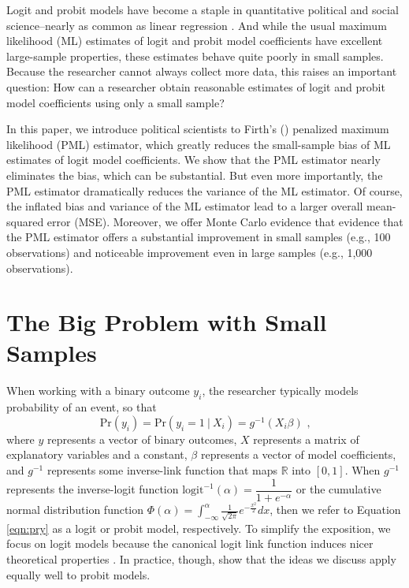 \documentclass[12pt]{article}
\begin{document}
 \vspace{5mm}
 \begin{center}
 \end{center}

\thispagestyle{empty}

\newpage
\doublespace


Logit and probit models have become a staple in quantitative political and social science--nearly as common as linear regression \citep{KruegerLewisBeck2008}. 
And while the usual maximum likelihood (ML) estimates of logit and probit model coefficients have excellent large-sample properties, these estimates behave quite poorly in small samples. 
Because the researcher cannot always collect more data, this raises an important question: How can a researcher obtain reasonable estimates of logit and probit model coefficients using only a small sample?

In this paper, we introduce political scientists to Firth's (\citeyear{Firth1993}) penalized maximum likelihood (PML) estimator, which greatly reduces the small-sample bias of ML estimates of logit model coefficients. 
We show that the PML estimator nearly eliminates the bias, which can be substantial. 
But even more importantly, the PML estimator dramatically reduces the variance of the ML estimator. 
Of course, the inflated bias and variance of the ML estimator lead to a larger overall mean-squared error (MSE). 
Moreover, we offer Monte Carlo evidence that evidence that the PML estimator offers a substantial improvement in small samples (e.g., 100 observations) and noticeable improvement even in large samples (e.g., 1,000 observations).

\section*{The Big Problem with Small Samples}

When working with a binary outcome $y_i$, the researcher typically models probability of an event, so that
\begin{equation}\label{eqn:pry}
\text{Pr}(y_i) = \text{Pr}(y_i = 1~|~ X_i) =  g^{-1}(X_i\beta)\text{ ,}
\end{equation}
where $y$ represents a vector of binary outcomes, $X$ represents a matrix of explanatory variables and a constant, $\beta$ represents a vector of model coefficients, and $g^{-1}$ represents some inverse-link function that maps $\mathbb{R}$ into $[0, 1]$. 
When $g^{-1}$ represents the inverse-logit function $\text{logit}^{-1}(\alpha) = \dfrac{1}{1 + e^{-\alpha}}$ or the cumulative normal distribution function $\Phi(\alpha) = \int_{-\infty}^\alpha \frac{1}{\sqrt{2\pi}}e^{-\frac{x^2}{2}}dx$, then we refer to Equation \ref{eqn:pry} as a logit or probit model, respectively.
To simplify the exposition, we focus on logit models because the canonical logit link function induces nicer theoretical properties \citep[pp. 31-32]{McCullaghNelder1989}. 
In practice, though, \cite{KosmidisFirth2009} show that the ideas we discuss apply equally well to probit models.
\end{document}
